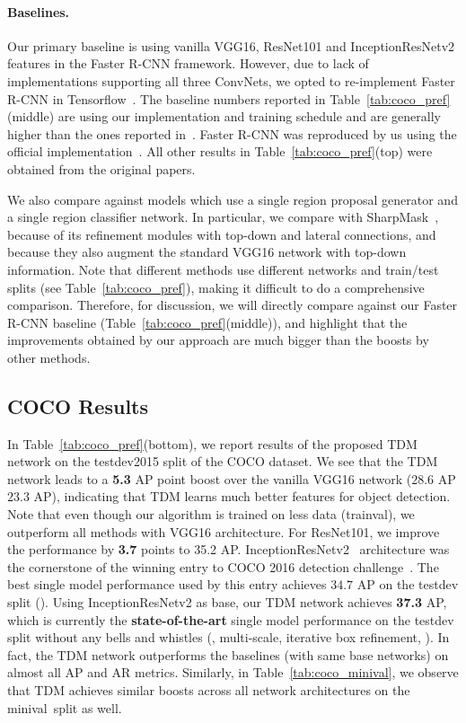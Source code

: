 \documentclass[10pt,twocolumn,letterpaper]{article}
\newcommand{\trainval}{trainval\raisebox{0.2ex}{$\ast$}}
\newcommand{\minival}{minival\raisebox{0.2ex}{$\ast$}}
\begin{document}
\vspace{-0.1in}
\paragraph{Baselines.} Our primary baseline is using vanilla VGG16, ResNet101 and InceptionResNetv2 features in the Faster R-CNN framework. However, due to lack of implementations supporting all three ConvNets, we opted to re-implement Faster R-CNN in Tensorflow~\cite{abadi2016tensorflow}. The baseline numbers reported in Table~\ref{tab:coco_pref}(middle) are using our implementation and training schedule and are generally higher than the ones reported in~\cite{ren2015faster,shrivastava2016contextual}. Faster R-CNN\raisebox{0.2ex}{$\star$} was reproduced by us using the official implementation~\cite{ren2015faster}. All other results in  Table~\ref{tab:coco_pref}(top) were obtained from the original papers. 

We also compare against models which use a single region proposal generator and a single region classifier network. In particular, we compare with SharpMask~\cite{pinheiro2016learning}, because of its refinement modules with top-down and lateral connections, and~\cite{shrivastava2016contextual} because they also augment the standard VGG16 network with top-down information. Note that different methods use different networks and train/test splits (see Table~\ref{tab:coco_pref}), making it difficult to do a comprehensive comparison. Therefore, for discussion, we will directly compare against our Faster R-CNN baseline (Table~\ref{tab:coco_pref}(middle)), and highlight that the improvements obtained by our approach are much bigger than the boosts by other methods.
\subsection{COCO Results}
In Table~\ref{tab:coco_pref}(bottom), we report results of the proposed TDM network on the testdev2015 split of the COCO dataset. We see that the TDM network leads to a \textbf{5.3} AP point boost over the vanilla VGG16 network ($28.6$ AP \vs $23.3$ AP), indicating that TDM learns much better features for object detection. Note that even though our algorithm is trained on less data (\trainval), we outperform all methods with VGG16 architecture. For ResNet101, we improve the performance by  \textbf{3.7} points to 35.2 AP. InceptionResNetv2~\cite{szegedy2016inception} architecture was the cornerstone of the winning entry to COCO 2016 detection challenge~\cite{huang2016speed}. The best single model performance used by this entry achieves $34.7$ AP on the testdev split (\cite{huang2016speed}). Using InceptionResNetv2 as base, our TDM network achieves \textbf{37.3} AP, which is currently the \textbf{state-of-the-art}  single model performance on the testdev split without any bells and whistles (\eg, multi-scale, iterative box refinement, \etc). In fact, the TDM network outperforms the baselines (with same base networks) on almost all AP and AR metrics. Similarly, in Table~\ref{tab:coco_minival}, we observe that TDM achieves similar boosts across all network architectures on the \minival\ split as well.
\end{document}

